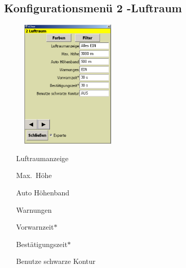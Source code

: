 \subsection{Konfigurationsmenü 2 -Luftraum}\label{Konfig2}
\begin{figure}
\includegraphics[width=4.5cm]{Bilder/Konfig2Luftraum.png}
\end{figure}
\begin{enumerate}
\item[Luftraumanzeige]
\item[Max.\ Höhe]
\item[Auto Höhenband]
\item[Warnungen]
\item[Vorwarnzeit$\ast$]
\item[Bestätigungszeit$\ast$]
\item[Benutze schwarze Kontur]
\end{enumerate}
 \qquad {}

